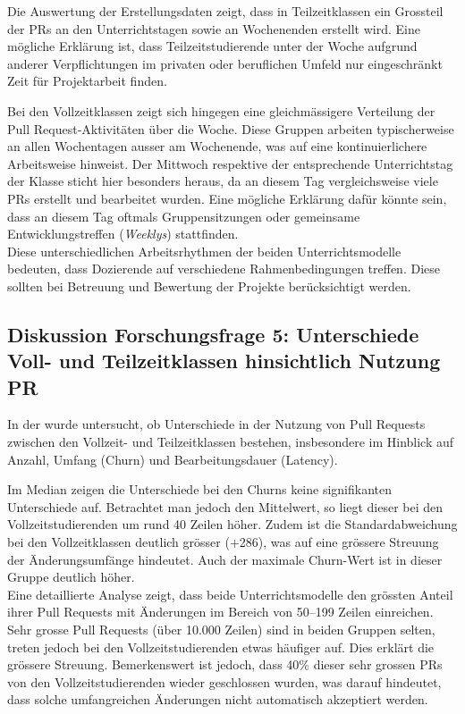 Die Auswertung der Erstellungsdaten zeigt, dass in Teilzeitklassen ein Grossteil der PRs an den Unterrichtstagen sowie an Wochenenden erstellt wird. Eine mögliche Erklärung ist, dass Teilzeitstudierende unter der Woche aufgrund anderer Verpflichtungen im privaten oder beruflichen Umfeld nur eingeschränkt Zeit für Projektarbeit finden.

Bei den Vollzeitklassen zeigt sich hingegen eine gleichmässigere Verteilung der Pull Request-Aktivitäten über die Woche. Diese Gruppen arbeiten typischerweise an allen Wochentagen ausser am Wochenende, was auf eine kontinuierlichere Arbeitsweise hinweist. Der Mittwoch respektive der entsprechende Unterrichtstag der Klasse sticht hier besonders heraus, da an diesem Tag vergleichsweise viele PRs erstellt und bearbeitet wurden. Eine mögliche Erklärung dafür könnte sein, dass an diesem Tag oftmals Gruppensitzungen oder gemeinsame Entwicklungstreffen (\textit{Weeklys}) stattfinden. \\
Diese unterschiedlichen Arbeitsrhythmen der beiden Unterrichtsmodelle bedeuten, dass Dozierende auf verschiedene Rahmenbedingungen treffen. Diese sollten bei Betreuung und Bewertung der Projekte berücksichtigt werden.

\subsection{Diskussion Forschungsfrage 5: Unterschiede Voll- und Teilzeitklassen hinsichtlich Nutzung PR}
In der  wurde untersucht, ob Unterschiede in der Nutzung von Pull Requests zwischen den Vollzeit- und Teilzeitklassen bestehen, insbesondere im Hinblick auf Anzahl, Umfang (Churn) und Bearbeitungsdauer (Latency).

Im Median zeigen die Unterschiede bei den Churns keine signifikanten Unterschiede auf. Betrachtet man jedoch den Mittelwert, so liegt dieser bei den Vollzeitstudierenden um rund 40 Zeilen höher. Zudem ist die Standardabweichung bei den Vollzeitklassen deutlich grösser (+286), was auf eine grössere Streuung der Änderungsumfänge hindeutet. Auch der maximale Churn-Wert ist in dieser Gruppe deutlich höher. \\
Eine detaillierte Analyse zeigt, dass beide Unterrichtsmodelle den grössten Anteil ihrer Pull Requests mit Änderungen im Bereich von 50–199 Zeilen einreichen. Sehr grosse Pull Requests (über 10.000 Zeilen) sind in beiden Gruppen selten, treten jedoch bei den Vollzeitstudierenden etwas häufiger auf. Dies erklärt die grössere Streuung. Bemerkenswert ist jedoch, dass 40\% dieser sehr grossen PRs von den Vollzeitstudierenden wieder geschlossen wurden, was darauf hindeutet, dass solche umfangreichen Änderungen nicht automatisch akzeptiert werden.


